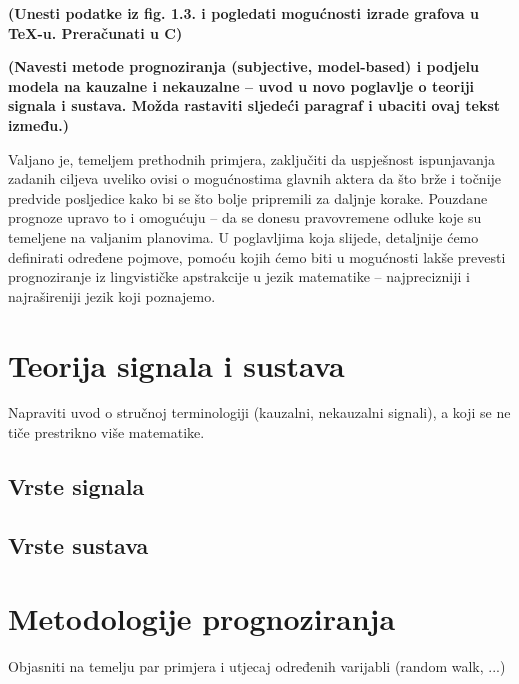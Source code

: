 \documentclass[a4paper,12pt,oneside]{memoir}
\begin{document}

        \textbf{(Unesti podatke iz fig. 1.3. i pogledati mogućnosti izrade grafova u TeX-u. Preračunati u \textdegree C)}

        \textbf{(Navesti metode prognoziranja (subjective, model-based) i podjelu modela na kauzalne i nekauzalne -- uvod u novo poglavlje o teoriji signala i sustava. Možda rastaviti sljedeći paragraf i ubaciti ovaj tekst između.)}



        Valjano je, temeljem prethodnih primjera, zaključiti da uspješnost ispunjavanja zadanih ciljeva uveliko ovisi o mogućnostima glavnih aktera da što brže i točnije predvide posljedice kako bi se što bolje pripremili za daljnje korake. Pouzdane prognoze upravo to i omogućuju -- da se donesu pravovremene odluke koje su temeljene na valjanim planovima. U poglavljima koja slijede, detaljnije ćemo definirati određene pojmove, pomoću kojih ćemo biti u mogućnosti lakše prevesti prognoziranje iz lingvističke apstrakcije u jezik matematike -- najprecizniji i najrašireniji jezik koji poznajemo.

        \section{Teorija signala i sustava}
            Napraviti uvod o stručnoj terminologiji (kauzalni, nekauzalni signali), a koji se ne tiče prestrikno više matematike.
            \subsection{Vrste signala}
            \subsection{Vrste sustava}
        \section{Metodologije prognoziranja} %
            Objasniti na temelju par primjera i utjecaj određenih varijabli (random walk, ...)
\end{document}
